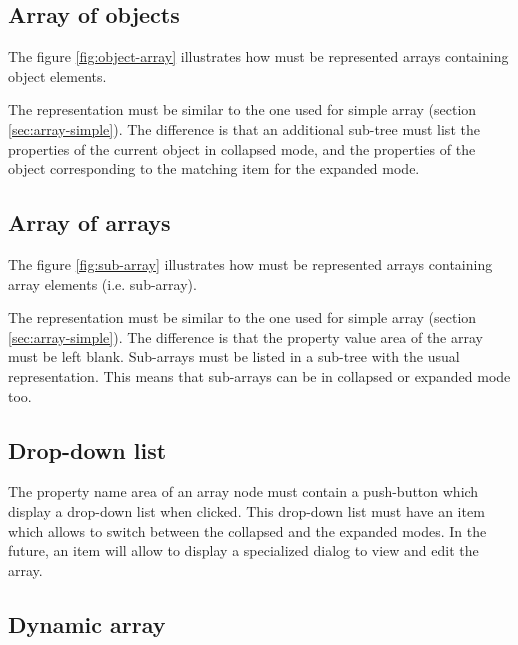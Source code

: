 \documentclass[a4paper, twoside]{report}
\begin{document}

\subsection{Array of objects\label{sec:array-object}}

The figure \ref{fig:object-array} illustrates how must be represented arrays containing object
elements.

The representation must be similar to the one used for simple array (section
\ref{sec:array-simple}). The difference is that an additional sub-tree must list the properties of the
current object in collapsed mode, and the properties of the object corresponding to the matching
item for the expanded mode.


\subsection{Array of arrays\label{sec:array-subarray}}

The figure \ref{fig:sub-array} illustrates how must be represented arrays containing array elements
(i.e. sub-array).

The representation must be similar to the one used for simple array (section
\ref{sec:array-simple}). The difference is that the property value area of the array must be left
blank. Sub-arrays must be listed in a sub-tree with the usual representation. This means that
sub-arrays can be in collapsed or expanded mode too.


\subsection{Drop-down list\label{sec:array-dropdownlist}}

The property name area of an array node must contain a push-button which display a drop-down list
when clicked. This drop-down list must have an item which allows to switch between the collapsed and
the expanded modes. In the future, an item will allow to display a specialized dialog to view and
edit the array.

\subsection{Dynamic array\label{sec:array-dynamic}}
\end{document}
